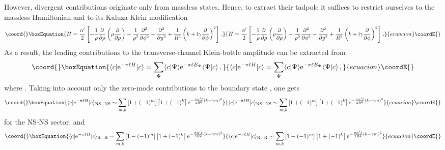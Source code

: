 \documentclass[a4paper,12pt]{article}
\begin{document}
However, divergent contributions originate only from massless 
states. Hence, to extract their tadpole it suffices to restrict ourselves to
the massless Hamiltonian and to its Kaluza-Klein modification
\begin{equation}\coord{}\boxEquation{
H = {\alpha ' \over 2} \left[ -{1\over \rho} {\partial \over \partial \rho}
\left( \rho {\partial \over \partial \rho} \right) - {1\over \rho^2}
{\partial ^2 \over \partial \phi^2} - {\partial^2 \over \partial y^2}
+ {1\over R^2}\left( k + {\rm i} \gamma {\partial \over \partial \phi}
\right)^2 \right]\,.
}{
H = {\alpha ' \over 2} \left[ -{1\over \rho} {\partial \over \partial \rho}
\left( \rho {\partial \over \partial \rho} \right) - {1\over \rho^2}
{\partial ^2 \over \partial \phi^2} - {\partial^2 \over \partial y^2}
+ {1\over R^2}\left( k + {\rm i} \gamma {\partial \over \partial \phi}
\right)^2 \right]\,.
}{ecuacion}\coordE{}\end{equation}
As a result, the leading contributions to the transverse-channel Klein-bottle
amplitude can be extracted from
\begin{equation}\coord{}\boxEquation{
\langle c | {\rm e}^{-\pi\ell H} |c\rangle = \sum_{\Psi} \langle c|\Psi 
\rangle {\rm e}^{-\pi \ell E_\Psi} \langle \Psi | c \rangle\,,
}{
\langle c | {\rm e}^{-\pi\ell H} |c\rangle = \sum_{\Psi} \langle c|\Psi 
\rangle {\rm e}^{-\pi \ell E_\Psi} \langle \Psi | c \rangle\,,
}{ecuacion}\coordE{}\end{equation}
where \coordHE{}. Taking into account only the 
zero-mode contributions to the boundary state \coordHE{}, one gets\cite{adm}
\begin{equation}\coord{}\boxEquation{
\langle c | {\rm e}^{-\pi\ell H} |c\rangle_{\rm NS-NS} \sim \sum_{m,k}
\left[1+(-1)^m \right] \left[1+(-1)^k\right] {\rm e}^{-{\pi \alpha ' \ell
\over 2 R^2} (k-\gamma m)^2} \label{NSNS}
}{
\langle c | {\rm e}^{-\pi\ell H} |c\rangle_{\rm NS-NS} \sim \sum_{m,k}
\left[1+(-1)^m \right] \left[1+(-1)^k\right] {\rm e}^{-{\pi \alpha ' \ell
\over 2 R^2} (k-\gamma m)^2} }{ecuacion}\coordE{}\end{equation}
for the NS-NS sector, and
\begin{equation}\coord{}\boxEquation{
\langle c | {\rm e}^{-\pi\ell H} |c\rangle_{\rm R-R} \sim \sum_{m,k}
\left[1-(-1)^m \right] \left[1+(-1)^k\right] {\rm e}^{-{\pi \alpha ' \ell
\over 2 R^2} (k-\gamma m)^2} \label{RR}
}{
\langle c | {\rm e}^{-\pi\ell H} |c\rangle_{\rm R-R} \sim \sum_{m,k}
\left[1-(-1)^m \right] \left[1+(-1)^k\right] {\rm e}^{-{\pi \alpha ' \ell
\over 2 R^2} (k-\gamma m)^2} }{ecuacion}\coordE{}\end{equation}
\end{document}
